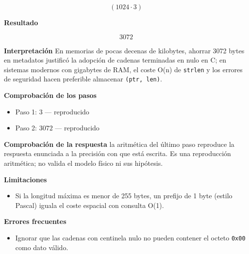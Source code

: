 \documentclass{book}
\begin{document}
\begin{tcolorbox}[title={Problema resuelto}, studiumworked, breakable]
\begin{enumerate}
\[
\left(1024\cdot 3\right)
\]
\end{enumerate}

\noindent\textbf{Resultado}

\[
3072
\]

\noindent\textbf{Interpretación}
En memorias de pocas decenas de kilobytes, ahorrar 3072 bytes en metadatos justificó la adopción de cadenas terminadas en nulo en C; en sistemas modernos con gigabytes de RAM, el coste O(n) de \texttt{strlen} y los errores de seguridad hacen preferible almacenar \texttt{(ptr, len)}.

\noindent\textbf{Comprobación de los pasos}
\begin{itemize}
\item Paso 1: $3$ — reproducido
\item Paso 2: $3072$ — reproducido
\end{itemize}

\noindent\textbf{Comprobación de la respuesta} la aritmética del último paso reproduce la respuesta enunciada a la precisión con que está escrita. Es una reproducción aritmética; no valida el modelo físico ni sus hipótesis.

\noindent\textbf{Limitaciones}
\begin{itemize}
\item Si la longitud máxima es menor de 255 bytes, un prefijo de 1 byte (estilo Pascal) iguala el coste espacial con consulta O(1).
\end{itemize}

\noindent\textbf{Errores frecuentes}
\begin{itemize}
\item Ignorar que las cadenas con centinela nulo no pueden contener el octeto \texttt{0x00} como dato válido.
\end{itemize}
\end{tcolorbox}
\end{document}
